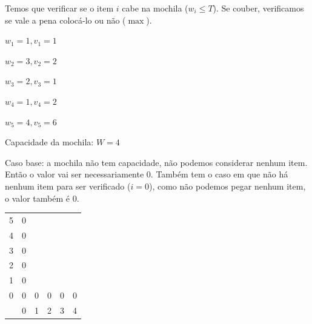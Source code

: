 Temos que verificar se o item $i$ cabe na mochila ($w_i \leq T$). Se couber, verificamos se vale a pena colocá-lo ou não ($\max$).

\begin{example}
	$w_1 = 1, v_1 = 1$

	$w_2 = 3, v_2 = 2$

	$w_3 = 2, v_3 = 1$

	$w_4 = 1, v_4 = 2$

	$w_5 = 4, v_5 = 6$

	Capacidade da mochila: $W = 4$

	Caso base: a mochila não tem capacidade, não podemos considerar nenhum item. Então o valor vai ser necessariamente $0$. Também tem o caso em que não há nenhum item para ser verificado ($i = 0$), como não podemos pegar nenhum item, o valor também é $0$.

	\begin{center}
		\begin{tabular}{c|c|c|c|c|c|}
			\cline{2-6}
			5                                              & 0                     &                       &                       &                       &                       \\ \cline{2-6}
			4                                              & 0                     &                       &                       &                       &                       \\ \cline{2-6}
			3                                              & 0                     &                       &                       &                       &                       \\ \cline{2-6}
			2                                              & 0                     &                       &                       &                       &                       \\ \cline{2-6}
			1                                              & 0                     &                       &                       &                       &                       \\ \cline{2-6}
			0                                              & 0                     & 0                     & 0                     & 0                     & 0                     \\ \cline{2-6}
			\multicolumn{1}{c}{\diagbox[dir=NE]{$i$}{$T$}} & \multicolumn{1}{c}{0} & \multicolumn{1}{c}{1} & \multicolumn{1}{c}{2} & \multicolumn{1}{c}{3} & \multicolumn{1}{c}{4}
		\end{tabular}
	\end{center}


\end{example}
